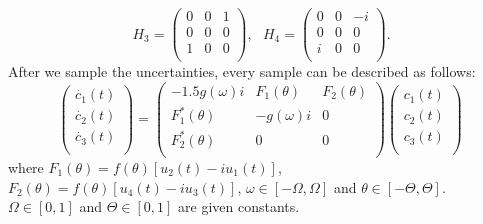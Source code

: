 \documentclass[letterpaper, 10 pt, conference]{ieeeconf}
\begin{document}
\begin{equation}
\ H_{3}=
\left(\begin{array}{ccc}
  0 & 0 & 1 \\
  0 & 0  & 0 \\
  1 & 0  & 0 \\
\end{array}\right), \ \ \ H_{4}=
\left(\begin{array}{ccc}
  0 & 0 & -i \\
  0 & 0  & 0 \\
  i & 0  & 0 \\
\end{array}\right).
\end{equation}
After we sample the uncertainties, every sample can be described as follows:
\begin{equation}\label{general3level}
\left(\begin{array}{c}
  \dot{c_{1}}(t) \\
  \dot{c_{2}}(t) \\
  \dot{c_{3}}(t) \\
\end{array}\right)=
\left(\begin{array}{ccc}
  -1.5g(\omega) i & F_{1}(\theta)  & F_{2}(\theta) \\
  F^{*}_{1}(\theta) & -g(\omega) i  & 0 \\
  F^{*}_{2}(\theta) & 0 & 0 \\
\end{array}\right) \left(\begin{array}{c}
  c_{1}(t) \\
  c_{2}(t) \\
  c_{3}(t) \\
\end{array}\right)
\end{equation}
where $F_{1}(\theta)=f(\theta)[u_{2}(t)-iu_{1}(t)]$, $F_{2}(\theta)=f(\theta)[u_{4}(t)-iu_{3}(t)]$, $\omega\in [-\Omega, \Omega]$ and $\theta \in [-\Theta,
\Theta]$. $\Omega \in [0,1]$ and $\Theta \in [0,1]$ are given
constants.
\end{document}
